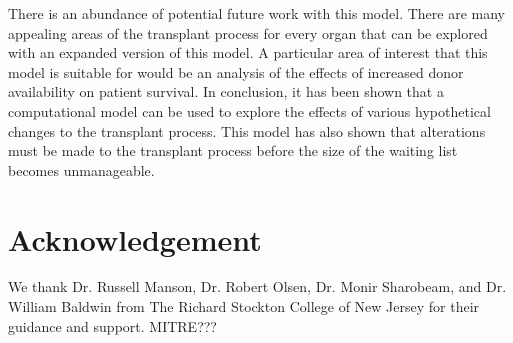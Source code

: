 \documentclass[9pt,a4paper,twocolumn]{scrartcl}
\begin{document}
There is an abundance of potential future work with this model.  There are many appealing areas of the transplant process for every organ that can be explored with an expanded version of this model.  A particular area of interest that this model is suitable for would be an analysis of the effects of increased donor availability on patient survival.  
In conclusion, it has been shown that a computational model can be used to explore the effects of various hypothetical changes to the transplant process. This model has also shown that alterations must be made to the transplant process before the size of the waiting list becomes unmanageable.

\section{Acknowledgement}
We thank Dr. Russell Manson, Dr. Robert Olsen, Dr. Monir Sharobeam, and Dr. William Baldwin from The Richard Stockton College of New Jersey for their guidance and support. MITRE???
\end{document}
